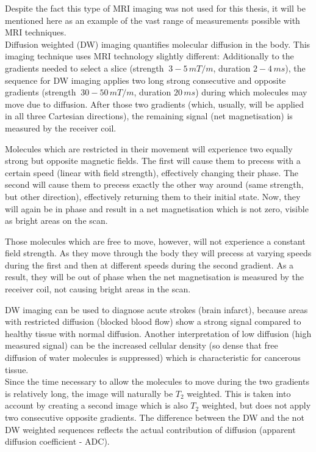 Despite the fact this type of MRI imaging was not used for this thesis, it will be mentioned here as an example of the vast range of measurements possible with MRI techniques.
\\
Diffusion weighted (DW) imaging quantifies molecular diffusion in the body.
This imaging technique uses MRI technology slightly different:
Additionally to the gradients needed to select a slice (strength $~3-5\, mT/m$, duration $2-4\, ms$), the sequence for DW imaging applies two long strong consecutive and opposite gradients (strength $~30-50\, mT/m$, duration $20\, ms$) during which molecules may move due to diffusion.
After those two gradients (which, usually, will be applied in all three Cartesian directions), the remaining signal (net magnetisation) is measured by the receiver coil.

Molecules which are restricted in their movement will experience two equally strong but opposite magnetic fields.
The first will cause them to precess with a certain speed (linear with field strength), effectively changing their phase.
The second will cause them to precess exactly the other way around (same strength, but other direction), effectively returning them to their initial state.
Now, they will again be in phase and result in a net magnetisation which is not zero, visible as bright areas on the scan.

Those molecules which are free to move, however, will not experience a constant field strength.
As they move through the body they will precess at varying speeds during the first and then at different speeds during the second gradient.
As a result, they will be out of phase when the net magnetisation is measured by the receiver coil, not causing bright areas in the scan.

DW imaging can be used to diagnose acute strokes (brain infarct), because areas with restricted diffusion (blocked blood flow) show a strong signal compared to healthy tissue with normal diffusion.
Another interpretation of low diffusion (high measured signal) can be the increased cellular density (so dense that free diffusion of water molecules is suppressed) which is characteristic for cancerous tissue.\\

Since the time necessary to allow the molecules to move during the two gradients is relatively long, the image will naturally be $T_2$ weighted.
This is taken into account by creating a second image which is also $T_2$ weighted, but does not apply two consecutive opposite gradients.
The difference between the DW and the not DW weighted sequences reflects the actual contribution of diffusion (apparent diffusion coefficient - ADC).


